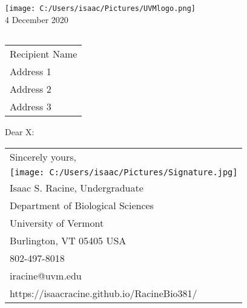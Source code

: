 \documentclass[10pt]{article} %
\begin{document}

\raggedright %
\texttt{[image: C:/Users/isaac/Pictures/UVMlogo.png]}\\ %

 \hfill\hfill\hfill %
 4 December 2020\\[10pt]  %
 
\begin{tabular}{l@{}}
\end{tabular}

\begin{tabular}{@{}l}
Recipient Name\\
Address 1\\
Address 2\\
Address 3
\end{tabular}


Dear X:

\lipsum[1-2]





\begin{tabular}{@{}l}
Sincerely yours,\\
\texttt{[image: C:/Users/isaac/Pictures/Signature.jpg]}\\
Isaac S. Racine, Undergraduate\\
Department of Biological Sciences\\
University of Vermont\\
Burlington, VT 05405 USA\\
802-497-8018\\
iracine@uvm.edu\\
https://isaacracine.github.io/RacineBio381/\\
\end{tabular}
\end{document}
